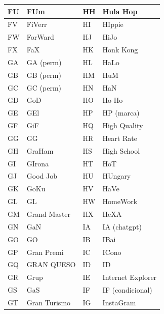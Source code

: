\begin{table}[ht]
    \centering
    \begin{tabular}{|l|l|l|l|}
        FU & FUm            & HH & Hula Hop             \\\hline
        FV & FiVerr         & HI & HIppie               \\\hline
        FW & ForWard        & HJ & HiJo                 \\\hline
        FX & FaX            & HK & Honk Kong            \\\hline
        GA & GA (perm)      & HL & HaLo                 \\\hline
        GB & GB (perm)      & HM & HuM                  \\\hline
        GC & GC (perm)      & HN & HaN                  \\\hline
        GD & GoD            & HO & Ho Ho                \\\hline
        GE & GEl            & HP & HP (marca)           \\\hline
        GF & GiF            & HQ & High Quality         \\\hline
        GG & GG             & HR & Heart Rate           \\\hline
        GH & GraHam         & HS & High School          \\\hline
        GI & GIrona         & HT & HoT                  \\\hline
        GJ & Good Job       & HU & HUngary              \\\hline
        GK & GoKu           & HV & HaVe                 \\\hline
        GL & GL             & HW & HomeWork             \\\hline
        GM & Grand Master   & HX & HeXA                 \\\hline
        GN & GaN            & IA & IA (chatgpt)         \\\hline
        GO & GO             & IB & IBai                 \\\hline
        GP & Gran Premi     & IC & ICono                \\\hline
        GQ & GRAN QUESO     & ID & ID                   \\\hline
        GR & Grup           & IE & Internet Explorer    \\\hline
        GS & GaS            & IF & IF (condicional)     \\\hline
        GT & Gran Turismo   & IG & InstaGram            \\\hline

\end{tabular}
\end{table}
